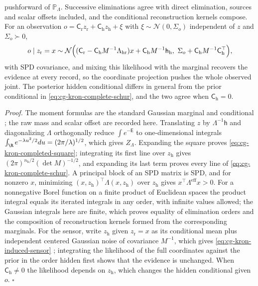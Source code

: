 pushforward of \(\mathbb P_\Lambda\). Successive eliminations agree with direct
elimination, sources and scalar offsets included, and the conditional
reconstruction kernels compose. For an observation
\(o=\mathsf C_{\mathrm r}z_{\mathrm r}+\mathsf C_{\mathrm h}z_{\mathrm h}+\xi\) with
\(\xi\sim\mathcal N(0,\Sigma_o)\) independent of \(z\) and \(\Sigma_o\succ0\),
\begin{equation}
o\mid z_{\mathrm r}=x\sim
\mathcal N\Bigl(
(\mathsf C_{\mathrm r}-\mathsf C_{\mathrm h}M^{-1}\Lambda_{\mathrm{hr}})x
+\mathsf C_{\mathrm h}M^{-1}\mathsf h_{\mathrm h},\
\Sigma_o+\mathsf C_{\mathrm h}M^{-1}\mathsf C_{\mathrm h}^\top
\Bigr),
\label{eq:cg-kron-induced-sensor}
\end{equation}
with SPD covariance, and mixing this likelihood with the marginal recovers the
evidence at every record, so the coordinate projection pushes the whole
observed joint. The posterior hidden conditional differs in general from the
prior conditional in \eqref{eq:cg-kron-complete-schur}, and the two agree when
\(\mathsf C_{\mathrm h}=0\). \status{ESTABLISHED}

\noindent\emph{Proof.}
The moment formulas are the standard Gaussian marginal and conditional
\citep[Secs.~2.3.1--2.3.2, Eqs.~(2.73), (2.75), (2.91)--(2.93)]{Bishop2006};
the raw mass and scalar offset are recorded here. Translating \(z\) by
\(\Lambda^{-1}\mathsf h\) and diagonalizing \(\Lambda\) orthogonally reduce
\(\int e^{-\mathsf E}\) to one-dimensional integrals
\(\int_\R e^{-\lambda u^2/2}du=(2\pi/\lambda)^{1/2}\), which gives \(Z_\Lambda\).
Expanding the square proves \eqref{eq:cg-kron-completed-square}; integrating
its first line over \(z_{\mathrm h}\) gives
\((2\pi)^{n_{\mathrm h}/2}(\det M)^{-1/2}\), and expanding its last term proves
every line of \eqref{eq:cg-kron-complete-schur}. A principal block of an SPD
matrix is SPD, and for nonzero \(x\), minimizing
\((x,z_{\mathrm h})^\top\Lambda(x,z_{\mathrm h})\) over \(z_{\mathrm h}\) gives
\(x^\top\Lambda^{\mathrm{eff}}x>0\). For a nonnegative Borel function on a
finite product of Euclidean spaces the product integral equals its iterated
integrals in any order, with infinite values allowed; the Gaussian integrals
here are finite, which proves equality of elimination orders and the
composition of reconstruction kernels formed from the corresponding marginals.
For the sensor, write \(z_{\mathrm h}\) given \(z_{\mathrm r}=x\) as its
conditional mean plus independent centered Gaussian noise of covariance
\(M^{-1}\), which gives \eqref{eq:cg-kron-induced-sensor}
\citep[Sec.~2.3.3, Eq.~(2.115)]{Bishop2006}; integrating the likelihood of the
full coordinates against the prior in the order hidden first shows that the
evidence is unchanged. When \(\mathsf C_{\mathrm h}\neq0\) the likelihood depends
on \(z_{\mathrm h}\), which changes the hidden conditional given \(o\).
\(\square\)

